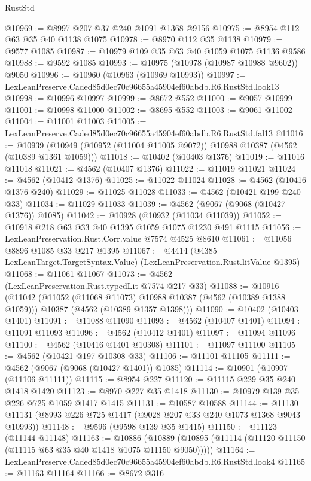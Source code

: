 \begin{lexlean}{RustStd}
\begin{coremodule}
@10969 := @8997 @207 @37 @240 @1091 @1368 @9156
@10975 := @8954 @112 @63 @35 @40 @1138 @1075
@10978 := @8970 @112 @35 @1138
@10979 := @9577 @1085
@10987 := @10979 @109 @35 @63 @40 @1059 @1075 @1136 @9586
@10988 := @9592 @1085
@10993 := @10975 (@10978 (@10987 @10988 @9602)) @9050
@10996 := @10960 (@10963 (@10969 @10993))
@10997 := LexLeanPreserve.Caded85d0ec70c96655a45904ef60abdb.R6.RustStd.look13
@10998 := @10996 @10997
@10999 := @8672 @552
@11000 := @9057 @10999
@11001 := @10998 @11000
@11002 := @8695 @552
@11003 := @9061 @11002
@11004 := @11001 @11003
@11005 := LexLeanPreserve.Caded85d0ec70c96655a45904ef60abdb.R6.RustStd.fal13
@11016 := @10939 (@10949 (@10952 (@11004 @11005 @9072)) @10988 @10387 (@4562 (@10389 @1361 @1059)))
@11018 := @10402 (@10403 @1376)
@11019 := @11016 @11018
@11021 := @4562 (@10407 @1376)
@11022 := @11019 @11021
@11024 := @4562 (@10412 @1376)
@11025 := @11022 @11024
@11028 := @4562 (@10416 @1376 @240)
@11029 := @11025 @11028
@11033 := @4562 (@10421 @199 @240 @33)
@11034 := @11029 @11033
@11039 := @4562 (@9067 (@9068 (@10427 @1376)) @1085)
@11042 := @10928 (@10932 (@11034 @11039))
@11052 := @10918 @218 @63 @33 @40 @1395 @1059 @1075 @1230 @491 @1115
@11056 := LexLeanPreservation.Rust.Corr.value @7574 @4525 @8610
@11061 := @11056 @8896 @1085 @33 @217 @1395
@11067 := @4414 (@4385 LexLeanTarget.TargetSyntax.Value) (LexLeanPreservation.Rust.litValue @1395)
@11068 := @11061 @11067
@11073 := @4562 (LexLeanPreservation.Rust.typedLit @7574 @217 @33)
@11088 := @10916
    (@11042
      (@11052 (@11068 @11073) @10988 @10387 (@4562 (@10389 @1388 @1059)))
      @10387
      (@4562 (@10389 @1357 @1398)))
@11090 := @10402 (@10403 @1401)
@11091 := @11088 @11090
@11093 := @4562 (@10407 @1401)
@11094 := @11091 @11093
@11096 := @4562 (@10412 @1401)
@11097 := @11094 @11096
@11100 := @4562 (@10416 @1401 @10308)
@11101 := @11097 @11100
@11105 := @4562 (@10421 @197 @10308 @33)
@11106 := @11101 @11105
@11111 := @4562 (@9067 (@9068 (@10427 @1401)) @1085)
@11114 := @10901 (@10907 (@11106 @11111))
@11115 := @8954 @227
@11120 := @11115 @229 @35 @240 @1418 @1420
@11123 := @8970 @227 @35 @1418
@11130 := @10979 @139 @35 @226 @725 @1059 @1417 @1415
@11131 := @10587 @10588
@11144 := @11130 @11131 (@8993 @226 @725 @1417 (@9028 @207 @33 @240 @1073 @1368 @9043 @10993))
@11148 := @9596 (@9598 @139 @35 @1415)
@11150 := @11123 (@11144 @11148)
@11163 := @10886
    (@10889 (@10895 (@11114 (@11120 @11150 (@11115 @63 @35 @40 @1418 @1075 @11150 @9050)))))
@11164 := LexLeanPreserve.Caded85d0ec70c96655a45904ef60abdb.R6.RustStd.look4
@11165 := @11163 @11164
@11166 := @8672 @316

\end{coremodule}
\end{lexlean}

